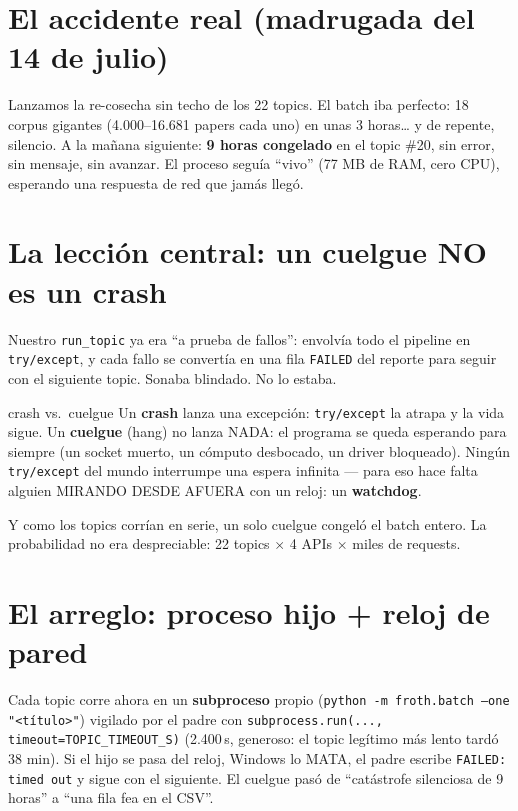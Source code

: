 \documentclass[11pt,a4paper]{article}
\begin{document}

\section{El accidente real (madrugada del 14 de julio)}

Lanzamos la re-cosecha sin techo de los 22 topics. El batch iba perfecto: 18 corpus
gigantes (4.000--16.681 papers cada uno) en unas 3 horas\ldots{} y de repente, silencio.
A la mañana siguiente: \textbf{9 horas congelado} en el topic \#20, sin error, sin
mensaje, sin avanzar. El proceso seguía ``vivo'' (77 MB de RAM, cero CPU), esperando
una respuesta de red que jamás llegó.

\section{La lección central: un cuelgue NO es un crash}

Nuestro \texttt{run\_topic} ya era ``a prueba de fallos'': envolvía todo el pipeline en
\texttt{try/except}, y cada fallo se convertía en una fila \texttt{FAILED} del reporte
para seguir con el siguiente topic. Sonaba blindado. No lo estaba.

\begin{concepto}{crash vs.\ cuelgue}
Un \textbf{crash} lanza una excepción: \texttt{try/except} la atrapa y la vida sigue.
Un \textbf{cuelgue} (hang) no lanza NADA: el programa se queda esperando para siempre
(un socket muerto, un cómputo desbocado, un driver bloqueado). Ningún
\texttt{try/except} del mundo interrumpe una espera infinita --- para eso hace falta
alguien MIRANDO DESDE AFUERA con un reloj: un \textbf{watchdog}.
\end{concepto}

Y como los topics corrían en serie, un solo cuelgue congeló el batch entero. La
probabilidad no era despreciable: 22 topics $\times$ 4 APIs $\times$ miles de requests.

\section{El arreglo: proceso hijo + reloj de pared}

Cada topic corre ahora en un \textbf{subproceso} propio
(\texttt{python -m froth.batch --one "<título>"}) vigilado por el padre con
\texttt{subprocess.run(..., timeout=TOPIC\_TIMEOUT\_S)} (2.400\,s, generoso: el topic
legítimo más lento tardó 38 min). Si el hijo se pasa del reloj, Windows lo MATA, el
padre escribe \texttt{FAILED: timed out} y sigue con el siguiente. El cuelgue pasó de
``catástrofe silenciosa de 9 horas'' a ``una fila fea en el CSV''.
\end{document}
